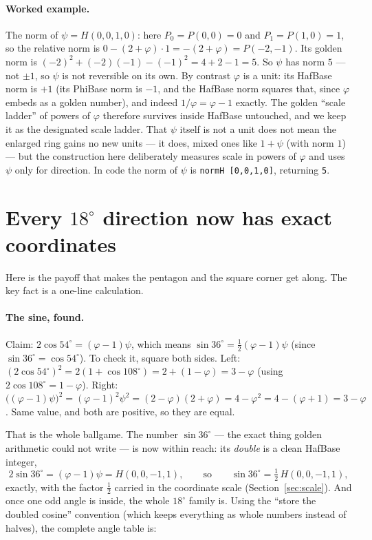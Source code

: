 \documentclass[11pt]{article}
\newcommand{\phigr}{\varphi}
\newcommand{\Hn}[4]{H(#1,#2,#3,#4)}
\newcommand{\Pn}[2]{P(#1,#2)}
\begin{document}
\paragraph{Worked example.} The norm of $\psi = \Hn{0}{0}{1}{0}$: here $P_0 = \Pn{0}{0} = 0$ and
$P_1 = \Pn{1}{0} = 1$, so the relative norm is $0 - (2+\phigr)\cdot 1 = -(2 + \phigr) = \Pn{-2}{-1}$.
Its golden norm is $(-2)^2 + (-2)(-1) - (-1)^2 = 4 + 2 - 1 = 5$. So $\psi$ has norm $5$ --- not $\pm1$,
so $\psi$ is not reversible on its own. By contrast $\phigr$ is a unit: its HafBase norm is $+1$ (its
PhiBase norm is $-1$, and the HafBase norm squares that, since $\phigr$ embeds as a golden number), and
indeed $1/\phigr = \phigr - 1$ exactly. The golden ``scale ladder'' of powers of $\phigr$ therefore
survives inside HafBase untouched, and we keep it as the designated scale ladder. That $\psi$ itself is
not a unit does not mean the enlarged ring gains no new units --- it does, mixed ones like $1 + \psi$
(with norm $1$) --- but the construction here deliberately measures scale in powers of $\phigr$ and uses
$\psi$ only for direction. In code the norm of $\psi$ is \verb|normH [0,0,1,0]|, returning \verb|5|.

\section{Every $18^\circ$ direction now has exact coordinates}

Here is the payoff that makes the pentagon and the square corner get along. The key fact is a
one-line calculation.

\paragraph{The sine, found.} Claim: $2\cos 54^\circ = (\phigr - 1)\psi$, which means
$\sin 36^\circ = \tfrac{1}{2}(\phigr-1)\psi$ (since $\sin 36^\circ = \cos 54^\circ$). To check it,
square both sides. Left: $(2\cos 54^\circ)^2 = 2(1 + \cos 108^\circ) = 2 + (1 - \phigr) = 3 - \phigr$
(using $2\cos 108^\circ = 1 - \phigr$). Right: $\big((\phigr-1)\psi\big)^2 = (\phigr-1)^2\psi^2
= (2 - \phigr)(2 + \phigr) = 4 - \phigr^2 = 4 - (\phigr + 1) = 3 - \phigr$. Same value, and both are
positive, so they are equal.

That is the whole ballgame. The number $\sin 36^\circ$ --- the exact thing golden arithmetic could
not write --- is now within reach: its \emph{double} is a clean HafBase integer,
\[
2\sin 36^\circ = (\phigr-1)\psi = \Hn{0}{0}{-1}{1}, \qquad\text{so}\qquad \sin 36^\circ = \tfrac12\,\Hn{0}{0}{-1}{1},
\]
exactly, with the factor $\tfrac12$ carried in the coordinate scale (Section~\ref{sec:scale}). And once
one odd angle is inside, the
whole $18^\circ$ family is. Using the ``store the doubled cosine'' convention (which keeps
everything as whole numbers instead of halves), the complete angle table is:
\end{document}

